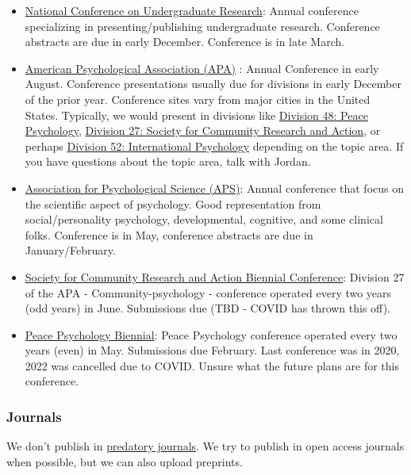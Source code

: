\documentclass[
]{book}
\begin{document}
\begin{itemize}
\item
  \href{https://www.cur.org/what/events/students/ncur/}{National Conference on Undergraduate Research}: Annual conference specializing in presenting/publishing undergraduate research. Conference abstracts are due in early December. Conference is in late March.
\item
  \href{https://convention.apa.org/}{American Psychological Association (APA)} : Annual Conference in early August. Conference presentations usually due for divisions in early December of the prior year. Conference sites vary from major cities in the United States. Typically, we would present in divisions like \href{https://www.apa.org/about/division/div48}{Division 48: Peace Psychology}, \href{https://scra27.org/}{Division 27: Society for Community Research and Action}, or perhaps \href{https://div52.net/}{Division 52: International Psychology} depending on the topic area. If you have questions about the topic area, talk with Jordan.
\item
  \href{https://www.psychologicalscience.org/conventions}{Association for Psychological Science (APS)}: Annual conference that focus on the scientific aspect of psychology. Good representation from social/personality psychology, developmental, cognitive, and some clinical folks. Conference is in May, conference abstracts are due in January/February.
\item
  \href{https://www.scra27.org/event/biennial-conference/}{Society for Community Research and Action Biennial Conference}: Division 27 of the APA - Community-psychology - conference operated every two years (odd years) in June. Submissions due (TBD - COVID has thrown this off).
\item
  \href{http://peacepsychology.org/conference}{Peace Psychology Biennial}: Peace Psychology conference operated every two years (even) in May. Submissions due February. Last conference was in 2020, 2022 was cancelled due to COVID. Unsure what the future plans are for this conference.
\end{itemize}

\hypertarget{journals}{%
\subsubsection{Journals}\label{journals}}

We don't publish in \href{https://beallslist.net/}{predatory journals}. We try to publish in open access journals when possible, but we can also upload preprints.
\end{document}
